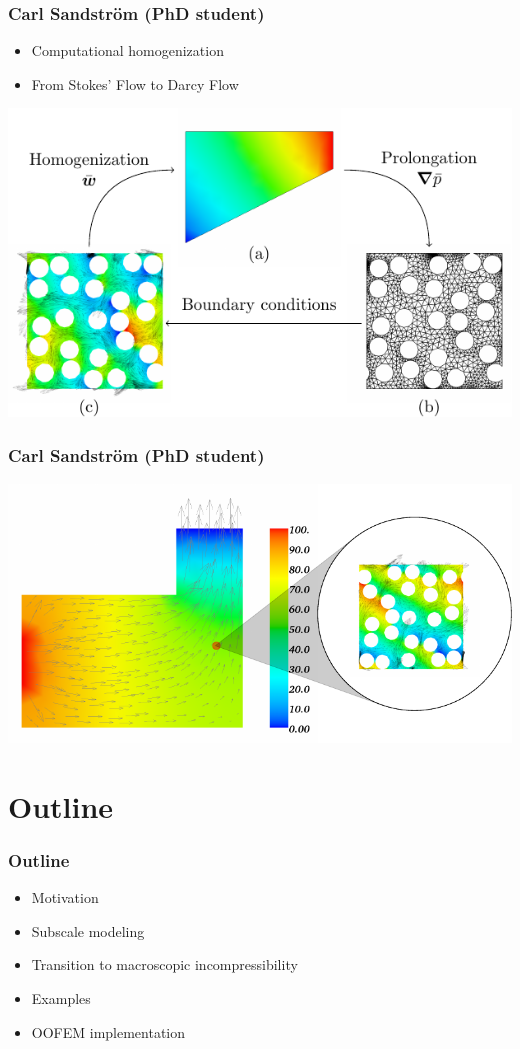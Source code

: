 \documentclass[11pt]{beamer} %
\begin{document}
\begin{frame}
\frametitle{Carl Sandström (PhD student)}
 \begin{itemize}
  \item Computational homogenization
  \item From Stokes' Flow to Darcy Flow
 \end{itemize}
 \begin{center}
 \includegraphics[width=0.8\linewidth]{figures/Bild1-crop.pdf}
 \end{center}
\end{frame}

\begin{frame}
 \frametitle{Carl Sandström (PhD student)}
 \includegraphics[width=1\linewidth]{figures/FrontPage-crop.pdf}
\end{frame}

\section{Outline}
\begin{frame}
 \frametitle{Outline}

\begin{itemize}
 \item Motivation
 \item Subscale modeling
 \item Transition to macroscopic incompressibility
 \item Examples
 \item OOFEM implementation
\end{itemize}
\end{frame}
\end{document}

